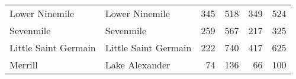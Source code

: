 \begin{table}[h!]
\begin{tabular}{llrrrr}
		Lower Ninemile             & Lower Ninemile                & 345                                  & 518                                  & 349                        & 524                        \\
		Sevenmile                  & Sevenmile                     & 259                                  & 567                                  & 217                        & 325                        \\
		Little Saint Germain       & Little Saint Germain          & 222                                  & 740                                  & 417                        & 625                        \\
		Merrill                    & Lake Alexander                & 74                                   & 136                                  & 66                         & 100                        \\
\hline
	\end{tabular}
	\label{table:res_table}
\end{table}	